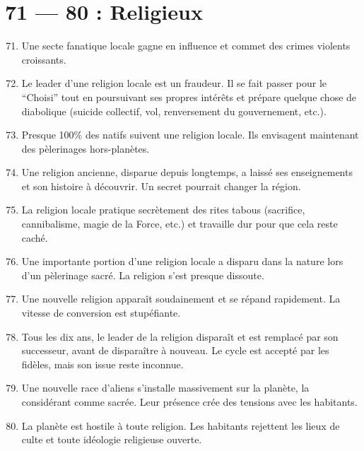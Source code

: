 \documentclass{article}
\begin{document}
\section*{71 --- 80 : Religieux}
\begin{enumerate}
	\setcounter{enumi}{70}
	\item Une secte fanatique locale gagne en influence et commet des crimes violents croissants.
	\item Le leader d’une religion locale est un fraudeur. Il se fait passer pour le “Choisi” tout en poursuivant ses propres intérêts et prépare quelque chose de diabolique (suicide collectif, vol, renversement du gouvernement, etc.).
	\item Presque 100\% des natifs suivent une religion locale. Ils envisagent maintenant des pèlerinages hors-planètes.
	\item Une religion ancienne, disparue depuis longtemps, a laissé ses enseignements et son histoire à découvrir. Un secret pourrait changer la région.
	\item La religion locale pratique secrètement des rites tabous (sacrifice, cannibalisme, magie de la Force, etc.) et travaille dur pour que cela reste caché.
	\item Une importante portion d’une religion locale a disparu dans la nature lors d’un pèlerinage sacré. La religion s’est presque dissoute.
	\item Une nouvelle religion apparaît soudainement et se répand rapidement. La vitesse de conversion est stupéfiante.
	\item Tous les dix ans, le leader de la religion disparaît et est remplacé par son successeur, avant de disparaître à nouveau. Le cycle est accepté par les fidèles, mais son issue reste inconnue.
	\item Une nouvelle race d’aliens s’installe massivement sur la planète, la considérant comme sacrée. Leur présence crée des tensions avec les habitants.
	\item La planète est hostile à toute religion. Les habitants rejettent les lieux de culte et toute idéologie religieuse ouverte.
\end{enumerate}
\end{document}
